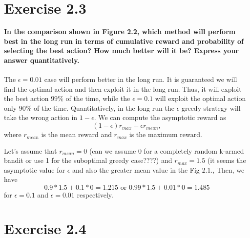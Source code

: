 \documentclass[a4paper,11pt]{article}
\numberwithin{equation}{section}
\theoremstyle{remark}
\begin{document}
\section{Exercise 2.3}

\textbf{In the comparison shown in Figure 2.2, which method will perform best in the long run in terms of cumulative reward and probability of selecting the best action? How much better will it be? Express your answer quantitatively.}
\\ \\

The $\epsilon=0.01$ case will perform better in the long run. It is guaranteed we will find the optimal action and then exploit it in the long run. Thus, it will exploit the best action  $99\%$ of the time, while the $\epsilon=0.1$  will exploit the optimal action only $90\%$ of the time.
Quantitatively, in the long run the $\epsilon$-greedy strategy will take the wrong action in $1 - \epsilon$. We can compute the asymptotic reward as
 $$(1 - \epsilon) r_{max} + \epsilon r_{mean},$$
where  $r_{mean}$ is the mean reward and  $r_{max}$ is the maximum reward. 

Let's assume that $r_{mean}=0$ (can we assume 0 for a completely random k-armed bandit or use 1 for the suboptimal greedy case????) and $r_{max} =1.5$ (it seems the asymptotic value for $\epsilon$ and also the greater mean value in the Fig 2.1.,  Then, we have 
$$
0.9*1.5 + 0.1 *0 = 1.215 \text{ or } 0.99*1.5 + 0.01*0 = 1.485
$$
for $\epsilon=0.1$ and $\epsilon=0.01$ respectively.   



\section{Exercise 2.4}
\end{document}
